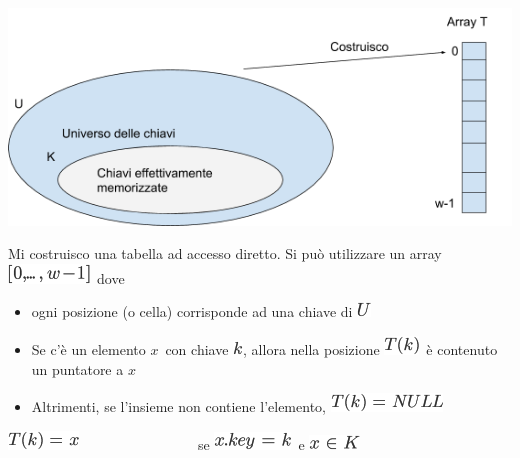 \documentclass{article}
\providecommand{\tightlist}{%
  \setlength{\itemsep}{0pt}\setlength{\parskip}{0pt}}
\begin{document}
{\includegraphics{images/image521.png}}

{}

{Mi costruisco una tabella ad accesso diretto. Si può utilizzare un
array }\includegraphics{images/image225.png}{~dove}

\begin{itemize}
\tightlist
\item
  {ogni posizione (o cella) corrisponde ad una chiave di
  }\includegraphics{images/image222.png}
\item
  {Se c'è un elemento }$x${~con chiave
  }\includegraphics{images/image118.png}{, allora nella posizione
  }\includegraphics{images/image226.png}{~è contenuto un puntatore a
  }$x$
\item
  {Altrimenti, se l'insieme non contiene l'elemento,
  }\includegraphics{images/image227.png}
\end{itemize}

{}

\includegraphics{images/image228.png}{~~~~~~~~~~~~~~~~~se
}\includegraphics{images/image229.png}{~e
}\includegraphics{images/image230.png}
\end{document}
